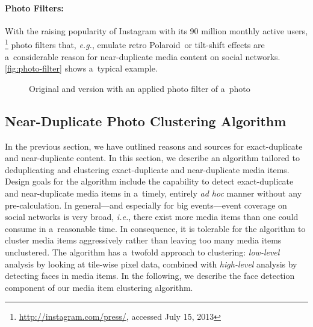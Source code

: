 \paragraph{Photo Filters:}

With the raising popularity of Instagram with its 90 million monthly active users,%
\footnote{\url{http://instagram.com/press/}, accessed July 15, 2013}
photo filters that, \emph{e.g.}, emulate retro Polaroid\texttrademark\ or tilt-shift effects
are a~considerable reason for near-duplicate media content on social networks.
\autoref{fig:photo-filter} shows a~typical example.

\begin{figure}[!ht]
  \centering
  \caption{Original and version with an applied photo filter of a~photo}
  \label{fig:photo-filter}
\end{figure}

\subsection{Near-Duplicate Photo Clustering Algorithm}
\label{sec:near-duplicate-clustering-algorithm}

In the previous section, we have outlined
reasons and sources for exact-duplicate and near-duplicate content.
In this section, we describe an algorithm tailored to
deduplicating and clustering exact-duplicate and near-duplicate media items.
Design goals for the algorithm include
the capability to detect exact-duplicate and near-duplicate media items
in a~timely, entirely \emph{ad hoc} manner without any pre-calculation.
In general---and especially for big events---event coverage on social networks
is very broad, \emph{i.e.}, there exist more media items
than one could consume in a~reasonable time.
In consequence, it is tolerable for the algorithm to cluster media items aggressively
rather than leaving too many media items unclustered.
The algorithm has a~twofold approach to clustering:
\emph{low-level} analysis by looking at tile-wise pixel data,
combined with \emph{high-level} analysis by detecting faces in media items.
In the following, we describe the face detection component
of our media item clustering algorithm.

